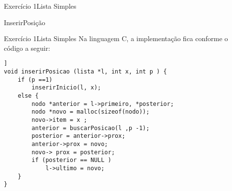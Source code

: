 \documentclass[aspectratio=169]{beamer}
\begin{document}
\begin{frame}[fragile]{Exercício 1}{Lista Simples}
\scalebox{0.6} {
\begin{algorithm}[H]
\caption{InserirPosição} 
\label{ListaSimplesInserirPosicao}
\end{algorithm}
}%
\end{frame}


\begin{frame}[fragile]{Exercício 1}{Lista Simples}
Na linguagem C, a implementação fica conforme o código a seguir:
\begin{lstlisting}[style=CStyle]]
void inserirPosicao (lista *l, int x, int p ) {
    if (p ==1)
        inserirInicio(l, x);
    else {
        nodo *anterior = l->primeiro, *posterior;
        nodo *novo = malloc(sizeof(nodo));
        novo->item = x ;
        anterior = buscarPosicao(l ,p -1);
        posterior = anterior->prox;
        anterior->prox = novo;
        novo-> prox = posterior;
        if (posterior == NULL )
            l->ultimo = novo;
    }
}
\end{lstlisting}  
\end{frame}
\end{document}
